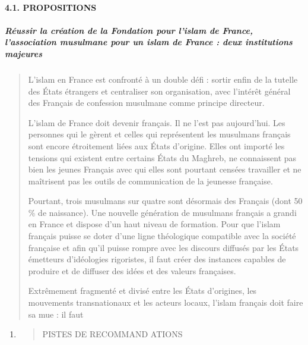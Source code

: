 \hypertarget{propositions}{%
\paragraph{4.1. PROPOSITIONS}\label{propositions}}

\hypertarget{ruxe9ussir-la-cruxe9ation-de-la-fondation-pour-lislam-de-france-lassociation-musulmane-pour-un-islam-de-france-deux-institutions-majeures}{%
\subparagraph{Réussir la création de la Fondation pour l'islam de
France, l'association musulmane pour un islam de France : deux
institutions
majeures}\label{ruxe9ussir-la-cruxe9ation-de-la-fondation-pour-lislam-de-france-lassociation-musulmane-pour-un-islam-de-france-deux-institutions-majeures}}

\begin{quote}
L'islam en France est confronté à un double défi : sortir enfin de la
tutelle des États étrangers et centraliser son organisation, avec
l'intérêt général des Français de confession musulmane comme principe
directeur.

L'islam de France doit devenir français. Il ne l'est pas aujourd'hui.
Les personnes qui le gèrent et celles qui représentent les musulmans
français sont encore étroitement liées aux États d'origine. Elles ont
importé les tensions qui existent entre certains États du Maghreb, ne
connaissent pas bien les jeunes Français avec qui elles sont pourtant
censées travailler et ne maîtrisent pas les outils de communication de
la jeunesse française.

Pourtant, trois musulmans sur quatre sont désormais des Français (dont
50 \% de naissance). Une nouvelle génération de musulmans français a
grandi en France et dispose d'un haut niveau de formation. Pour que
l'islam français puisse se doter d'une ligne théologique compatible avec
la société française et afin qu'il puisse rompre avec les discours
diffusés par les États émetteurs d'idéologies rigoristes, il faut créer
des instances capables de produire et de diffuser des idées et des
valeurs françaises.

Extrêmement fragmenté et divisé entre les États d'origines, les
mouvements transnationaux et les acteurs locaux, l'islam français doit
faire sa mue : il faut
\end{quote}

\begin{enumerate}
\def\labelenumi{\Roman{enumi}.}
\setcounter{enumi}{3}
\item
  \begin{quote}
  PISTES DE RECOMMAND ATIONS
  \end{quote}
\end{enumerate}

